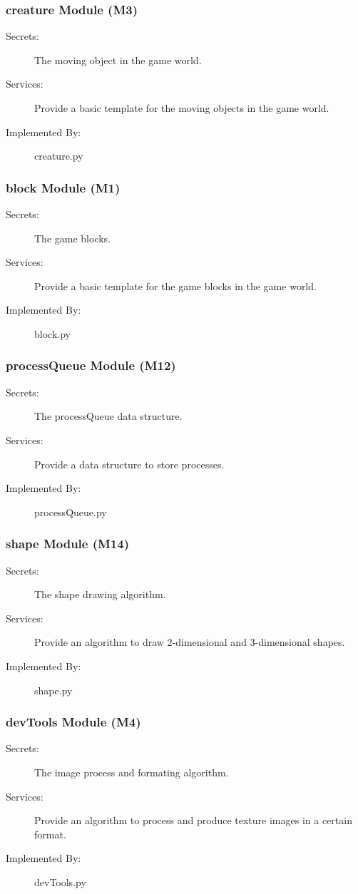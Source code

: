 \documentclass[12pt, titlepage]{article}
\begin{document}
\subsubsection{creature Module (M3)}
\begin{description}
\item[Secrets:]The moving object in the game world.
\item[Services:]Provide a basic template for the moving objects in the game world.
\item[Implemented By:] creature.py
\end{description}


\subsubsection{block Module (M1)}
\begin{description}
\item[Secrets:]The game blocks.
\item[Services:]Provide a basic template for the game blocks in the game world.
\item[Implemented By:] block.py
\end{description}


\subsubsection{processQueue Module (M12)}
\begin{description}
\item[Secrets:]The processQueue data structure.
\item[Services:]Provide a data structure to store processes.
\item[Implemented By:] processQueue.py
\end{description}

\subsubsection{shape Module (M14)}
\begin{description}
\item[Secrets:]The shape drawing algorithm.
\item[Services:]Provide an algorithm to draw 2-dimensional and 3-dimensional shapes.
\item[Implemented By:] shape.py
\end{description}


\subsubsection{devTools Module (M4)}
\begin{description}
\item[Secrets:]The image process and formating algorithm.
\item[Services:]Provide an algorithm to process and produce texture images in a certain format.
\item[Implemented By:] devTools.py
\end{description}
\end{document}
